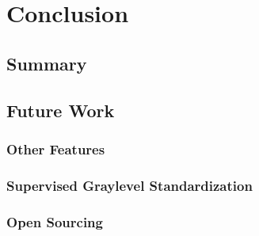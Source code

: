 \chapter{Conclusion}
\section{Summary}
\section{Future Work}
%
% 
\subsection{Other Features}
\subsection{Supervised Graylevel Standardization}
\subsection{Open Sourcing}
